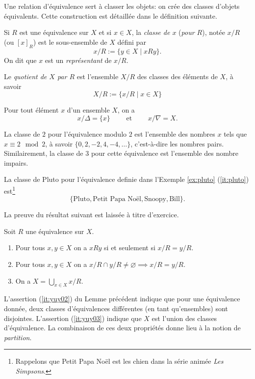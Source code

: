 \documentclass[french,course,oneside,theoremnosection]{lecture}
\begin{document}
Une relation d'équivalence sert à classer les objets: on crée des classes d'objets équivalents. Cette construction est détaillée dans le définition suivante.

\begin{definition}
Si $R$ est une équivalence sur $X$ et si $x\in X$, la \emph{classe de $x$} (\emph{pour $R$}), notée $x{/}R$ (ou $[x]_R$) est le sous-ensemble  de $X$ défini par
\[
x{/}R:=\{y \in X \mid xRy\}.
\]
On dit que $x$ est un \emph{représentant} de $x{/}R$.

Le \emph{quotient de $X$ par $R$} est l'ensemble  $X{/}R$ des classes des éléments de $X$, à savoir
\[
X/R:=\{x{/}R \mid x \in X\}
\]
\begin{example}
Pour tout élément $x$ d'un ensemble $X$, on a
\[
x{/}\Delta=\{x\} \qquad \text{ et } \qquad x{/}\nabla=X.
\]
\item La classe de $2$ pour l'équivalence modulo $2$ est l'ensemble des nombres $x$ tels que $x \equiv 2 \mod 2$, à savoir $\{0,2,-2,4,-4,\ldots\}$, c'est-à-dire les nombres pairs. Similairement, la classe de $3$ pour cette équivalence est l'ensemble des nombre impairs.
\item La classe de Pluto pour l'équivalence definie dans l'Exemple \ref{ex:pluto} (\ref{it:pluto}) est\footnote{Rappelons que Petit Papa Noël est les chien dans la série animée \emph{Les Simpsons}.} \[\{\text{Pluto}, \text{Petit Papa Noël}, \text{Snoopy}, \text{Bill}\}.\]
\end{example}
La preuve du résultat suivant est laissée à titre d'exercice.
\begin{lemma}\label{lem:quot}
Soit $R$ une équivalence sur $X$.
\begin{enumerate}
\item Pour tous $x, y\in X$ on a $xRy$ si et seulement si $x{/R}=y{/R}$.
\item\label{it:yuy02} Pour tous $x, y \in X$ on a $x{/}R\cap y{/}R\neq \varnothing \implies x{/}R = y{/}R$.
\item\label{it:yuy03} On a $X={\bigcup}_{x\in X}x{/}R$.
\end{enumerate}
\end{lemma}

L'assertion (\ref{it:yuy02}) du Lemme précédent indique que pour une équivalence donnée, deux classes d'équivalences différentes (en tant qu'ensembles) sont disjointes. L'assertion (\ref{it:yuy03}) indique que $X$ est l'union des classes d'équivalence. La combinaison de ces deux propriétés donne lieu à la notion de \emph{partition}.


\end{definition}
\end{document}

